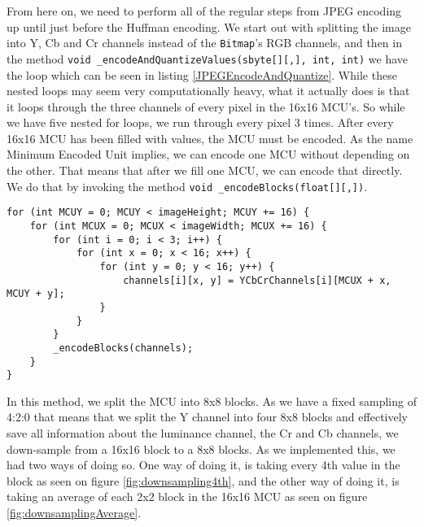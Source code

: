 From here on, we need to perform all of the regular steps from JPEG encoding up until just before the Huffman encoding.
We start out with splitting the image into Y, Cb and Cr channels instead of the \lstinline|Bitmap|'s RGB channels, and then in the method \lstinline|void _encodeAndQuantizeValues(sbyte[][,], int, int)| we have the loop which can be seen in listing \ref{JPEGEncodeAndQuantize}.
While these nested loops may seem very computationally heavy, what it actually does is that it loops through the three channels of every pixel in the 16x16 MCU's.
So while we have five nested for loops, we run through every pixel 3 times.
After every 16x16 MCU has been filled with values, the MCU must be encoded.
As the name Minimum Encoded Unit implies, we can encode one MCU without depending on the other.
That means that after we fill one MCU, we can encode that directly. We do that by invoking the method \lstinline|void _encodeBlocks(float[][,])|.

\begin{lstlisting}[firstnumber=525, label=JPEGEncodeAndQuantize, caption={Shows how the image is divided into MCUs \textbf{File: }JPEGImage.cs}]
for (int MCUY = 0; MCUY < imageHeight; MCUY += 16) {
    for (int MCUX = 0; MCUX < imageWidth; MCUX += 16) {
        for (int i = 0; i < 3; i++) {
            for (int x = 0; x < 16; x++) {
                for (int y = 0; y < 16; y++) {
                    channels[i][x, y] = YCbCrChannels[i][MCUX + x, MCUY + y];
                }
            }
        }
        _encodeBlocks(channels);
    }
}
\end{lstlisting}

In this method, we split the MCU into 8x8 blocks.
As we have a fixed sampling of 4:2:0 that means that we split the Y channel into four 8x8 blocks and effectively save all information about the luminance channel, the Cr and Cb channels, we down-sample from a 16x16 block to a 8x8 blocks.
As we implemented this, we had two ways of doing so.
One way of doing it, is taking every 4th value in the block as seen on figure \ref{fig:downsampling4th}, and the other way of doing it, is taking an average of each 2x2 block in the 16x16 MCU as seen on figure \ref{fig:downsamplingAverage}.

